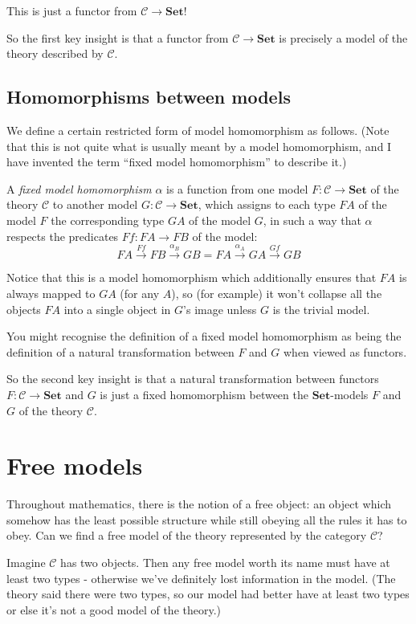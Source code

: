 \documentclass[11pt]{amsart}
\newcommand{\Set}{\mathbf{Set}}
\begin{document}
    This is just a functor from $\mathcal{C} \to \Set$!

    So the first key insight is that a functor from $\mathcal{C} \to \Set$ is precisely a model of the theory described by $\mathcal{C}$.

    \subsection{Homomorphisms between models}

    We define a certain restricted form of model homomorphism as follows.
    (Note that this is not quite what is usually meant by a model homomorphism, and I have invented the term ``fixed model homomorphism'' to describe it.)
    
    A \emph{fixed model homomorphism} $\alpha$ is a function from one model $F: \mathcal{C} \to \Set$ of the theory $\mathcal{C}$ to another model $G: \mathcal{C} \to \Set$, which assigns to each type $FA$ of the model $F$ the corresponding type $GA$ of the model $G$, in such a way that $\alpha$ respects the predicates $Ff: FA \to FB$ of the model:
    $$FA \xrightarrow{Ff} FB \xrightarrow{\alpha_B} GB = FA \xrightarrow{\alpha_A} GA \xrightarrow{Gf} GB$$

Notice that this is a model homomorphism which additionally ensures that $FA$ is always mapped to $GA$ (for any $A$), so (for example) it won't collapse all the objects $FA$ into a single object in $G$'s image unless $G$ is the trivial model.

    You might recognise the definition of a fixed model homomorphism as being the definition of a natural transformation between $F$ and $G$ when viewed as functors.

    So the second key insight is that a natural transformation between functors $F: \mathcal{C} \to \Set$ and $G$ is just a fixed homomorphism between the $\Set$-models $F$ and $G$ of the theory $\mathcal{C}$.

    \section{Free models}
    Throughout mathematics, there is the notion of a free object: an object which somehow has the least possible structure while still obeying all the rules it has to obey.
    Can we find a free model of the theory represented by the category $\mathcal{C}$?

    Imagine $\mathcal{C}$ has two objects. Then any free model worth its name must have at least two types - otherwise we've definitely lost information in the model.
    (The theory said there were two types, so our model had better have at least two types or else it's not a good model of the theory.)
\end{document}
